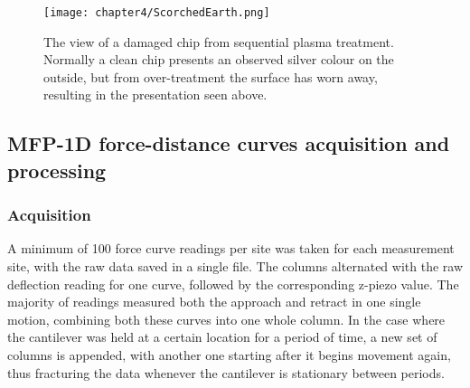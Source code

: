 \begin{figure}[h!]    
        \begin{center}
          \texttt{[image: chapter4/ScorchedEarth.png]}
\end{center}
\caption{The view of a damaged chip from sequential plasma treatment. Normally a clean chip presents an observed silver colour on the outside, but from over-treatment the surface has worn away, resulting in the presentation seen above.}
\label{fig:ScorchedEarth}                 
\end{figure}

\newpage



\newpage
%



\subsection{MFP-1D force-distance curves acquisition and processing}

\subsubsection{Acquisition}

A minimum of 100 force curve readings per site was taken for each measurement site, with the raw data saved in a single file. The columns alternated with the raw deflection reading for one curve, followed by the corresponding z-piezo value. The majority of readings measured both the approach and retract in one single motion, combining both these curves into one whole column. In the case where the cantilever was held at a certain location for a period of time, a new set of columns is appended, with another one starting after it begins movement again, thus fracturing the data whenever the cantilever is stationary between periods.


